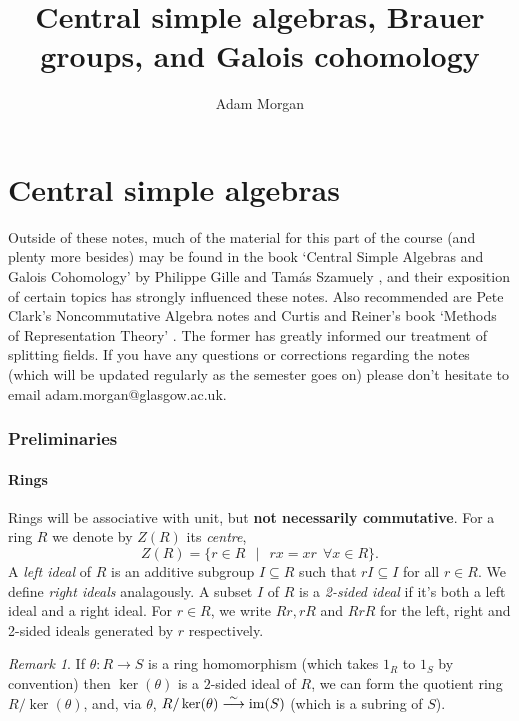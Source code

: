 \documentclass[11pt]{amsart}
\numberwithin{equation}{section}
\theoremstyle{remark}
\newtheorem{remark}[equation]{Remark}
\theoremstyle{remark}
\theoremstyle{remark}
\theoremstyle{definition}
\theoremstyle{definition}
\theoremstyle{definition}
\theoremstyle{definition}
\theoremstyle{definition}
\theoremstyle{definition}
\begin{document}
\title{Central simple algebras, Brauer groups, and Galois cohomology}
\author{Adam Morgan}

\maketitle
  
\setcounter{tocdepth}{1}
\tableofcontents

\newpage

\part{Central simple algebras}

Outside of these notes, much of the material for this part of the course (and plenty more besides) may be found in the book `Central Simple Algebras and Galois Cohomology' by Philippe Gille and Tam\'{a}s Szamuely \cite{MR2266528}, and their exposition of certain topics has strongly influenced these notes. Also recommended are Pete Clark's Noncommutative Algebra notes \cite{PC2011} and Curtis and Reiner's book `Methods of Representation Theory' \cite{MR1038525}. The former has greatly informed our treatment of splitting fields. If you have any questions or corrections regarding the notes (which will be updated regularly as the semester goes on) please don't hesitate to email adam.morgan@glasgow.ac.uk.

\section{Preliminaries}

\subsection{Rings}
Rings will be associative with unit, but \textbf{not necessarily commutative}. For a ring $R$ we denote by $Z(R)$ its \textit{centre},
\[Z(R)=\{r\in R~~\mid~~rx=xr~~\forall x\in R\}.\]
A \textit{left ideal} of $R$ is an additive subgroup $I\subseteq R$ such that $rI\subseteq I$ for all $r\in R$. We define \textit{right ideals} analagously. A subset $I$ of $R$ is a \textit{2-sided ideal} if it's both a left ideal and a right ideal. For $r\in R$, we write $Rr, rR$ and $RrR$ for the left, right and 2-sided ideals generated by $r$ respectively.

\begin{remark}
If $\theta:R\rightarrow S$ is a ring homomorphism (which takes $1_R$ to $1_S$ by convention) then $\ker(\theta)$ is a $2$-sided ideal of $R$, we can form the quotient ring $R/\ker(\theta)$, and, via $\theta$, $R/\ker(\theta)\stackrel{\sim}{\longrightarrow} \textup{im}(S)$ (which is a subring of $S$). 
\end{remark}
\end{document}
